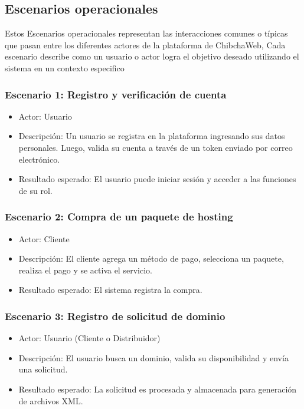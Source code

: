 \subsection{Escenarios operacionales}
Estos Escenarios operacionales representan las interacciones comunes o típicas que pasan entre los diferentes actores de la plataforma de ChibchaWeb, Cada escenario describe como un usuario o actor logra el objetivo deseado utilizando el sistema en un contexto especifico

\subsubsection{Escenario 1: Registro y verificación de cuenta}

\begin{itemize}
\item Actor: Usuario

\item Descripción: Un usuario se registra en la plataforma ingresando sus datos personales. Luego, valida su cuenta a través de un token enviado por correo electrónico.

\item Resultado esperado: El usuario puede iniciar sesión y acceder a las funciones de su rol.
\end{itemize}

\subsubsection{Escenario 2: Compra de un paquete de hosting}

\begin{itemize}
\item Actor: Cliente

\item Descripción: El cliente agrega un método de pago, selecciona un paquete, realiza el pago y se activa el servicio.

\item Resultado esperado: El sistema registra la compra.
\end{itemize}

\subsubsection{Escenario 3: Registro de solicitud de dominio}

\begin{itemize}
\item Actor: Usuario (Cliente o Distribuidor)

\item Descripción: El usuario busca un dominio, valida su disponibilidad y envía una solicitud.

\item Resultado esperado: La solicitud es procesada y almacenada para generación de archivos XML.
\end{itemize}


